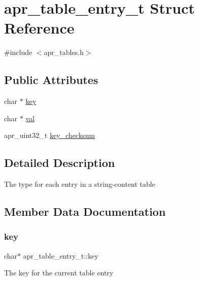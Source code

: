 \hypertarget{structapr__table__entry__t}{}\section{apr\+\_\+table\+\_\+entry\+\_\+t Struct Reference}
\label{structapr__table__entry__t}


{\ttfamily \#include $<$apr\+\_\+tables.\+h$>$}

\subsection*{Public Attributes}
\begin{DoxyCompactItemize}
\item 
char $\ast$ \mbox{\hyperlink{structapr__table__entry__t_abdccb35ea49dd95082fdce65a5a6001f}{key}}
\item 
char $\ast$ \mbox{\hyperlink{structapr__table__entry__t_a755371d0aa6a9487b502c34807271e6f}{val}}
\item 
apr\+\_\+uint32\+\_\+t \mbox{\hyperlink{structapr__table__entry__t_a0c51574420b6cc7bc6c2e35710e0ad3a}{key\+\_\+checksum}}
\end{DoxyCompactItemize}


\subsection{Detailed Description}
The type for each entry in a string-\/content table 

\subsection{Member Data Documentation}
\mbox{\label{structapr__table__entry__t_abdccb35ea49dd95082fdce65a5a6001f}} 
\subsubsection{\texorpdfstring{key}{key}}
{\footnotesize\ttfamily char$\ast$ apr\+\_\+table\+\_\+entry\+\_\+t\+::key}

The key for the current table entry \mbox{\label{structapr__table__entry__t_a0c51574420b6cc7bc6c2e35710e0ad3a}} 
